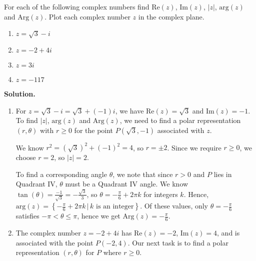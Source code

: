 \documentclass{ximera}
\begin{document}
\begin{ex} \label{plotmodargex}  For each of the following complex numbers find $\text{Re}(z)$, $\text{Im}(z)$, $|z|$, $\text{arg}(z)$ and $\text{Arg}(z)$.  Plot each complex number $z$ in the complex plane.

\begin{multicols}{4}

\begin{enumerate}

\item  $z = \sqrt{3}-i$

\item  $z = -2+4i$

\item  $z = 3i$

\item  $z = -117$

\end{enumerate}

\end{multicols}

{\bf Solution.} 

\begin{enumerate}

\item For $z = \sqrt{3} -i = \sqrt{3} + (-1)i$, we have $\text{Re}(z) = \sqrt{3}$ and $\text{Im}(z) = -1$.    To find $|z|$, $\text{arg}(z)$ and $\text{Arg}(z)$, we need to find a polar representation $(r,\theta)$ with $r \geq 0$ for the point $P(\sqrt{3},-1)$ associated with $z$.   

\smallskip

We know $r^2 = (\sqrt{3})^2 + (-1)^2 = 4$, so $r = \pm 2$.  Since we require $r \geq 0$, we choose $r =2$, so $|z| = 2$.

\smallskip

To find a corresponding angle $\theta$, we note that since $r>0$ and $P$ lies in Quadrant IV, $\theta$ must be a Quadrant IV angle.  We know $\tan(\theta) = \frac{-1}{\sqrt{3}} = -\frac{\sqrt{3}}{3}$, so $\theta = -\frac{\pi}{6} + 2\pi k$ for integers $k$.  Hence, $\text{arg}(z) = \left\{-\frac{\pi}{6} + 2\pi k \, | \, \text{$k$ is an integer} \right\}$. Of these values, only  $\theta = -\frac{\pi}{6}$  satisfies  $-\pi < \theta \leq \pi$, hence we get $\text{Arg}(z) = -\frac{\pi}{6}$.  

\item The complex number $z = -2+4i$ has  $\text{Re}(z) = -2$,   $\text{Im}(z) = 4$, and is associated with the point $P(-2,4)$.  Our next task is to find a polar representation $(r,\theta)$ for $P$ where $r \geq 0$.


\end{enumerate}
\end{ex}
\end{document}
